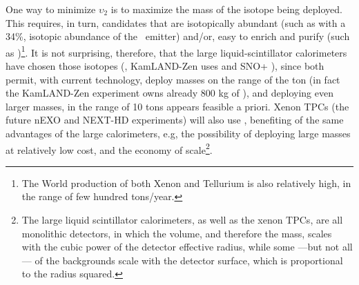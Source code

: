 One way to minimize $\upsilon_2$ is to maximize the mass of the isotope being deployed. This requires, in turn, candidates that are isotopically abundant (such as 
 with a 34\%, isotopic abundance of the \bb\ emitter) and/or, easy to enrich and purify (such as )\footnote{The World production of both Xenon and Tellurium is also relatively high, in the range of few hundred tons/year.}.
%
%
It is not surprising, therefore, that the large liquid-scintillator calorimeters have chosen those isotopes (, KamLAND-Zen uses  and SNO+ ), since both permit, with current technology, deploy masses on the range of the ton (in fact  the KamLAND-Zen experiment owns already 800 kg of ), and deploying even larger masses, in the range of 10 tons appears feasible a priori. Xenon TPCs (the future nEXO and NEXT-HD experiments) will also use , benefiting of the same advantages of the large calorimeters, e.g, the possibility of deploying large masses at relatively low cost, and the economy of scale\footnote{The large liquid scintillator calorimeters, as well as the xenon TPCs, are all monolithic detectors, in which the volume, and therefore the mass, scales with the cubic power of the detector effective radius, while some ---but not all--- of the backgrounds scale with the detector surface, which is proportional to the radius squared.}. 



